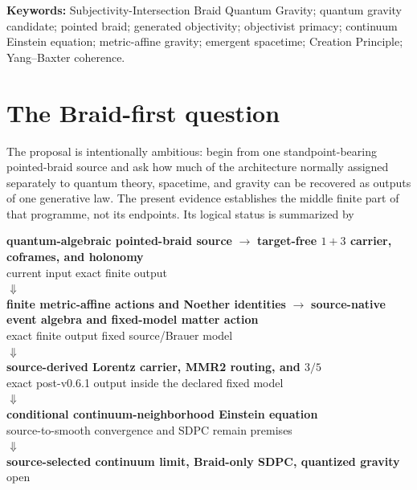 \documentclass[11pt]{article}
\theoremstyle{definition}
\theoremstyle{remark}
\begin{document}
\noindent\textbf{Keywords:} Subjectivity-Intersection Braid Quantum Gravity; quantum gravity candidate; pointed braid; generated objectivity; objectivist primacy; continuum Einstein equation; metric-affine gravity; emergent spacetime; Creation Principle; Yang--Baxter coherence.

\section{The Braid-first question}

The proposal is intentionally ambitious: begin from one standpoint-bearing pointed-braid source and ask how much of the architecture normally assigned separately to quantum theory, spacetime, and gravity can be recovered as outputs of one generative law. The present evidence establishes the middle finite part of that programme, not its endpoints. Its logical status is summarized by
\begin{center}
\begin{minipage}{0.96\linewidth}
\centering
\small
\textbf{quantum-algebraic pointed-braid source}
$\longrightarrow$
\textbf{target-free $1+3$ carrier, coframes, and holonomy}\\[-0.15em]
{\footnotesize current input \hspace{16em} exact finite output}\\[0.25em]
$\Downarrow$\\[-0.1em]
\textbf{finite metric-affine actions and Noether identities}
$\longrightarrow$
\textbf{source-native event algebra and fixed-model matter action}\\[-0.15em]
{\footnotesize exact finite output \hspace{6em} fixed source/Brauer model}\\[0.25em]
$\Downarrow$\\[-0.1em]
\textbf{source-derived Lorentz carrier, MMR2 routing, and $3/5$}\\[-0.15em]
{\footnotesize exact post-v0.6.1 output inside the declared fixed model}\\[0.25em]
$\Downarrow$\\[-0.1em]
\textbf{conditional continuum-neighborhood Einstein equation}\\[-0.15em]
{\footnotesize source-to-smooth convergence and SDPC remain premises}\\[0.25em]
$\Downarrow$\\[-0.1em]
\textbf{source-selected continuum limit, Braid-only SDPC, quantized gravity}\\[-0.15em]
{\footnotesize open}
\end{minipage}
\end{center}
\end{document}
